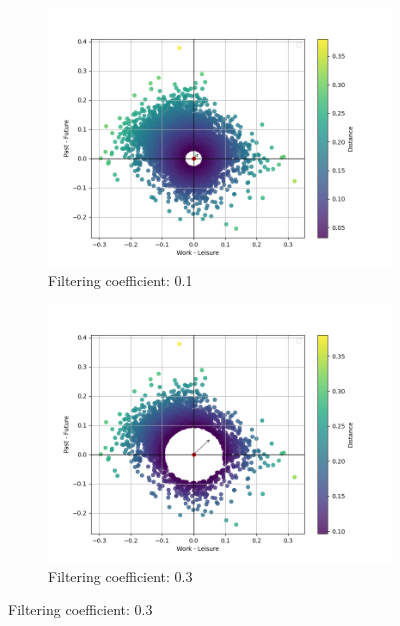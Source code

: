 \documentclass{article}
\begin{document}
\begin{figure}
 \begin{subfigure}{0.49\textwidth}
     \centering
     \includegraphics[width=\linewidth]{img/radius_optimization/0.1.png}
     \caption{Filtering coefficient: 0.1}
     \label{fig:a}
 \end{subfigure}
 \hfill
 \begin{subfigure}{0.49\textwidth}
     \centering
      \includegraphics[width=\linewidth]{img/radius_optimization/0.3.png}
     \caption{Filtering coefficient: 0.3}
     \label{fig:b}
 \end{subfigure}
 

\end{figure}
\end{document}
